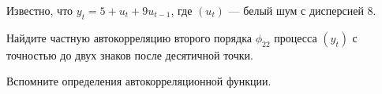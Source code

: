 
\begin{question}
Известно, что \(y_t = 5 + u_t + 9 u_{t-1}\), где \((u_t)\) --- белый шум с дисперсией 8.

Найдите частную автокорреляцию второго порядка \(\phi_{22}\) процесса \((y_t)\) с точностью до двух знаков после десятичной точки.
\end{question}

\begin{solution}
Вспомните определения автокорреляционной функции.
\end{solution}

